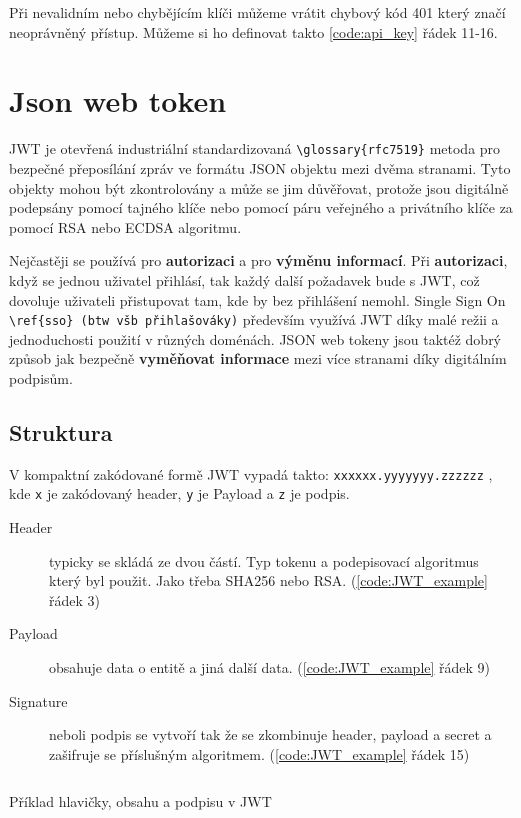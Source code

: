 Při nevalidním nebo chybějícím klíči můžeme vrátit chybový kód 401 který značí neoprávněný přístup. Můžeme si ho definovat takto \ref{code:api_key} řádek 11-16.





\section{Json web token} %
JWT je otevřená industriální standardizovaná \verb|\glossary{rfc7519}| metoda pro bezpečné přeposílání zpráv ve formátu JSON objektu mezi dvěma stranami.
Tyto objekty mohou být zkontrolovány a může se jim důvěřovat, protože jsou digitálně podepsány pomocí tajného klíče nebo pomocí páru veřejného a privátního klíče za pomocí RSA nebo ECDSA algoritmu.

Nejčastěji se používá pro \textbf{autorizaci} a pro \textbf{výměnu informací}. Při \textbf{autorizaci}, když se jednou uživatel přihlásí, tak každý další požadavek bude s JWT, což dovoluje uživateli přistupovat tam, kde by bez přihlášení nemohl. Single Sign On \verb|\ref{sso} (btw všb přihlašováky)| především využívá JWT díky malé režii a jednoduchosti použití v různých doménách. JSON web tokeny jsou taktéž dobrý způsob jak bezpečně \textbf{vyměňovat informace} mezi více stranami díky digitálním podpisům.

\subsection{Struktura}
V kompaktní zakódované formě JWT vypadá takto: \texttt{xxxxxx.yyyyyyy.zzzzzz} , kde \texttt{x} je zakódovaný header, \texttt{y} je Payload a \texttt{z} je podpis.

\begin{description}
    \item[Header] typicky se skládá ze dvou částí. Typ tokenu a podepisovací algoritmus který byl použit. Jako třeba SHA256 nebo RSA. (\ref{code:JWT_example} řádek 3)
    \item[Payload] obsahuje data o entitě a jiná další data. (\ref{code:JWT_example} řádek 9)
    \item[Signature] neboli podpis se vytvoří tak že se zkombinuje header, payload a secret a zašifruje se příslušným algoritmem. (\ref{code:JWT_example} řádek 15)
\end{description}

\begin{listing}[ht]
    \inputminted[]{json}{resources/code/security/JWT.jsonc}
    \caption{Příklad hlavičky, obsahu a podpisu v JWT} %
    \label{code:JWT_example}
\end{listing}






